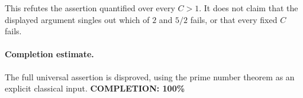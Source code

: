 This refutes the assertion quantified over every \(C>1\). It does not claim that the displayed argument singles out which of \(2\) and \(5/2\) fails, or that every fixed \(C\) fails.

\paragraph{Completion estimate.}
The full universal assertion is disproved, using the prime number theorem as an explicit classical input.
\textbf{COMPLETION: 100\%}
